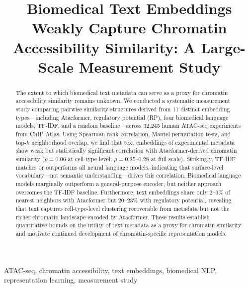 \documentclass[conference]{IEEEtran}
\begin{document}
\title{Biomedical Text Embeddings Weakly Capture Chromatin Accessibility
Similarity: A Large-Scale Measurement Study}

\author{
}

\maketitle

\begin{abstract}
The extent to which biomedical text metadata can serve as a proxy for
chromatin accessibility similarity remains unknown. We conducted a systematic
measurement study comparing pairwise similarity structures derived from 11
distinct embedding types---including Atacformer, regulatory potential (RP),
four biomedical language models, TF-IDF, and a random baseline---across
32,245 human ATAC-seq experiments from ChIP-Atlas. Using Spearman rank
correlation, Mantel permutation tests, and top-$k$ neighborhood overlap, we
find that text embeddings of experimental metadata show weak but statistically
significant correlation with Atacformer-derived chromatin similarity
($\rho = 0.06$ at cell-type level; $\rho = 0.25$--$0.28$ at full scale).
Strikingly, TF-IDF matches or outperforms all neural language models,
indicating that surface-level vocabulary---not semantic understanding---drives
this correlation. Biomedical language models marginally outperform a
general-purpose encoder, but neither approach overcomes the TF-IDF baseline.
Furthermore, text embeddings share only 2--3\% of nearest neighbors with
Atacformer but 20--23\% with regulatory potential, revealing that text captures
cell-type-level clustering recoverable from metadata but not the richer
chromatin landscape encoded by Atacformer. These results establish quantitative
bounds on the utility of text metadata as a proxy for chromatin similarity and
motivate continued development of chromatin-specific representation models.
\end{abstract}

\begin{IEEEkeywords}
ATAC-seq, chromatin accessibility, text embeddings, biomedical NLP,
representation learning, measurement study
\end{IEEEkeywords}


\end{document}
